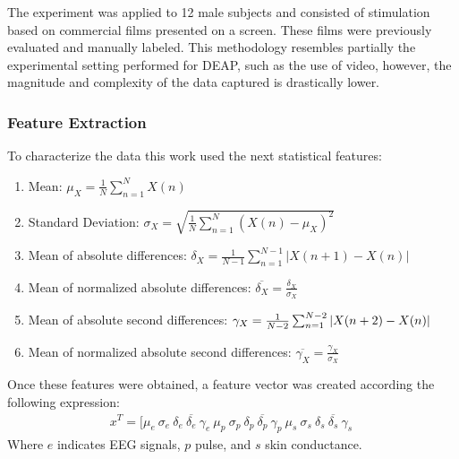 \documentclass{sig-alternate}
\begin{document}
The experiment  was applied to 12  male subjects and  
consisted of stimulation based  on commercial 
films presented on a screen. These films were previously 
evaluated and manually labeled. This methodology resembles
partially the experimental setting performed for DEAP, such
as the use of video, however, the magnitude and complexity of
the data captured is drastically lower.


\subsubsection{Feature Extraction}

To characterize the data this work used the next statistical features:
\begin{enumerate}
\item Mean:  $\mu_{X} = \frac{1}{N}\sum^{N}_{n=1} X(n)$
\item Standard Deviation:  $\sigma_{X} = \sqrt{ \frac{1}{N}\sum^{N}_{n=1} (X(n)-\mu_{X})^{2} }$
\item Mean of absolute differences:  $\delta_{X} = \frac{1}{N-1} \sum^{N-1}_{n=1}|X(n+1)-X(n)|$
\item Mean of normalized absolute differences: $\overline{\delta_{X}} = \frac{\delta_{X}}{\sigma_{X}}$
\item Mean of absolute second differences:  $\gamma_{X} = \frac{1}{N-2} \\
 \sum^{N-2}_{n=1}|X(n+2)-X(n)|$
\item Mean of normalized absolute second differences: $\overline{\gamma_{X}} = \frac{\gamma_{X}}{\sigma_{X}}$
\end{enumerate}  

Once these features were obtained, a feature vector was created according the following 
expression:
\begin{equation}
\begin{split}
x^{T} = [\mu_{e}\ \sigma_{e}\ \delta_{e}\ \overline{\delta_{e}}\ \gamma_{e}\ %
\mu_{p}\ \sigma_{p}\ \delta_{p}\ \overline{\delta_{p}}\ \gamma_{p}\ %
\mu_{s}\ \sigma_{s}\ \delta_{s}\ \overline{\delta_{s}}\ \gamma_{s}\ %
\end{split}
\end{equation}
Where $e$ indicates EEG signals, $p$ pulse, and $s$ skin conductance.
\end{document}
